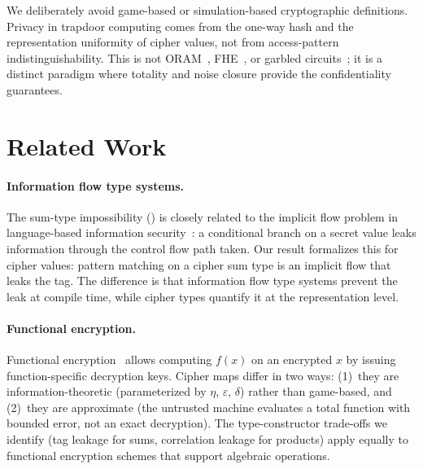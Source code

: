 \documentclass[11pt]{article}
\theoremstyle{definition}
\theoremstyle{plain}
\theoremstyle{remark}
\begin{document}
We deliberately avoid game-based or simulation-based cryptographic
definitions.
Privacy in trapdoor computing comes from the one-way hash and the
representation uniformity of cipher values, not from access-pattern
indistinguishability.
This is not ORAM~\cite{goldreich1996software}, FHE~\cite{gentry2009fully},
or garbled circuits~\cite{yao1982protocols}; it is a distinct paradigm
where totality and noise closure provide the confidentiality guarantees.


\section{Related Work}
\label{sec:related}

\paragraph{Information flow type systems.}
The sum-type impossibility () is closely
related to the implicit flow problem in language-based information
security~\cite{sabelfeld2003language}: a conditional branch on a secret
value leaks information through the control flow path taken.
Our result formalizes this for cipher values: pattern matching on a
cipher sum type is an implicit flow that leaks the tag.
The difference is that information flow type systems prevent the leak
at compile time, while cipher types quantify it at the representation
level.

\paragraph{Functional encryption.}
Functional encryption~\cite{boneh2011functional} allows computing
$f(x)$ on an encrypted $x$ by issuing function-specific decryption
keys.
Cipher maps differ in two ways: (1)~they are information-theoretic
(parameterized by $\eta$, $\varepsilon$, $\delta$) rather than
game-based, and (2)~they are approximate (the untrusted machine
evaluates a total function with bounded error, not an exact
decryption).
The type-constructor trade-offs we identify (tag leakage for sums,
correlation leakage for products) apply equally to functional
encryption schemes that support algebraic operations.
\end{document}

